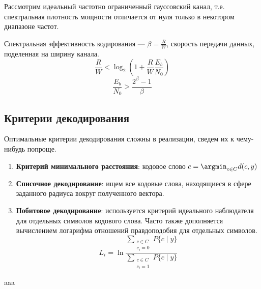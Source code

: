 \begin{example}
    Рассмотрим идеальный частотно ограниченный гауссовский канал,
    т.е. спектральная плотность мощности отличается от нуля только в некотором диапазоне частот.

    Спектральная эффективность кодирования --- \(\beta = \frac{R}{W}\), скорость передачи данных, поделенная на ширину канала.
    \[\frac{R}{W} < \log_2 \left(1 + \frac{R}{W} \frac{E_b}{N_0}\right)\]
    \[\frac{E_b}{N_0} > \frac{2^\beta - 1}{\beta}\]
\end{example}

\subsection{Критерии декодирования}

Оптимальные критерии декодирования сложны в реализации, сведем их к чему-нибудь попроще.

\begin{enumerate}
    \item \textbf{Критерий минимального расстояния}: кодовое слово \(c = \argmin_{c \in C} d(c, y)\)
    \item \textbf{Списочное декодирование}: ищем все кодовые слова,
    находящиеся в сфере заданного радиуса вокруг полученного вектора.
    \item \textbf{Побитовое декодирование}: используется критерий идеального наблюдателя для отдельных символов кодового слова.
    Часто также дополняется вычислением логарифма отношений правдоподобия для отдельных символов.
    \[L_i = \ln \frac{\sum_{\substack{c \in C \\ c_i = 0}} P \{c \mid y\}}{\sum_{\substack{c \in C \\ c_i = 1}} P \{c \mid y\}}\]
\end{enumerate}

aaa

\unfinished
